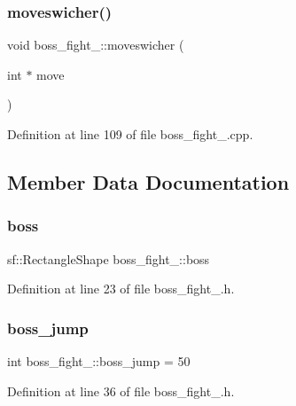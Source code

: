 \subsubsection{\texorpdfstring{moveswicher()}{moveswicher()}}
{\footnotesize\ttfamily void boss\+\_\+fight\+\_\+::moveswicher (\begin{DoxyParamCaption}\item[{int $\ast$}]{move }\end{DoxyParamCaption})}



Definition at line 109 of file boss\+\_\+fight\+\_.\+cpp.



\subsection{Member Data Documentation}
\hypertarget{classboss__fight__3_a2480d76c3edb348b0fb73a8119c9d30f}{}\label{classboss__fight__3_a2480d76c3edb348b0fb73a8119c9d30f} 
\subsubsection{\texorpdfstring{boss}{boss}}
{\footnotesize\ttfamily sf\+::\+Rectangle\+Shape boss\+\_\+fight\+\_\+::boss}



Definition at line 23 of file boss\+\_\+fight\+\_.\+h.

\hypertarget{classboss__fight__3_ac6429ba0ce3bf0a524b7fae7fcdae9b6}{}\label{classboss__fight__3_ac6429ba0ce3bf0a524b7fae7fcdae9b6} 
\subsubsection{\texorpdfstring{boss\+\_\+jump}{boss\_jump}}
{\footnotesize\ttfamily int boss\+\_\+fight\+\_\+::boss\+\_\+jump = 50}



Definition at line 36 of file boss\+\_\+fight\+\_.\+h.

\hypertarget{classboss__fight__3_a992244b468d2685c37553f4af23a50bc}{}\label{classboss__fight__3_a992244b468d2685c37553f4af23a50bc} 
